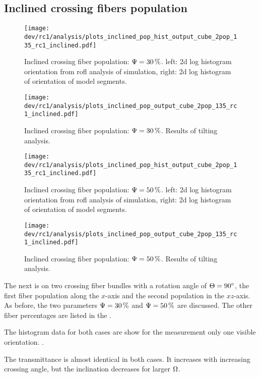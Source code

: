 \subsection{Inclined crossing fibers population}
\label{sec:resInclCross}
%
\begin{figure}[!t]
\centering
\texttt{[image: dev/rc1/analysis/plots\_inclined\_pop\_hist\_output\_cube\_2pop\_135\_rc1\_inclined.pdf]}
\caption{Inclined crossing fiber population: $\textnormal{$\Psi$}=\SI{30}{\percent}$. left: 2d log histogram orientation from rofl analysis of simulation, right: 2d log histogram of orientation of model segments.}
\label{fig:inclined_03_fiber_pop_hist}
\end{figure}
%
\begin{figure}[!p]
\centering
\texttt{[image: dev/rc1/analysis/plots\_inclined\_pop\_output\_cube\_2pop\_135\_rc1\_inclined.pdf]}
\caption{Inclined crossing fiber population: $\textnormal{$\Psi$}=\SI{30}{\percent}$. Results of tilting analysis. }
\label{fig:inclined_03_fiber_pop_rofl}
\end{figure}
%
\begin{figure}[!t]
\centering
\texttt{[image: dev/rc1/analysis/plots\_inclined\_pop\_hist\_output\_cube\_2pop\_135\_rc1\_inclined.pdf]}
\caption{Inclined crossing fiber population: $\textnormal{$\Psi$}=\SI{50}{\percent}$. left: 2d log histogram orientation from rofl analysis of simulation, right: 2d log histogram of orientation of model segments.}
\label{fig:inclined_05_fiber_pop_hist}
\end{figure}
%
\begin{figure}[!p]
\centering
\texttt{[image: dev/rc1/analysis/plots\_inclined\_pop\_output\_cube\_2pop\_135\_rc1\_inclined.pdf]}
\caption{Inclined crossing fiber population: $\textnormal{$\Psi$}=\SI{50}{\percent}$. Results of tilting analysis. }
\label{fig:inclined_05_fiber_pop_rofl}
\end{figure}
%
%
The next is on two crossing fiber bundles with a rotation angle of $\textnormal{$\Theta$} = \SI{90}{\degree}$, \ie{} the first fiber population along the $x$-axis and the second population in the $xz$-axis.
As before, the two parameters $\textnormal{$\Psi$} = \SI{30}{\percent}$ and $\textnormal{$\Psi$} = \SI{50}{\percent}$ are discussed.
The other fiber percentages are listed in the .
\par
%
The histogram data for both cases are show for the measurement only one visible orientation.
\dummy{}.
\par
The transmittance is almost identical in both cases.
It increases with increasing crossing angle, but the inclination decreases for larger $\textnormal{$\Omega$}$.

